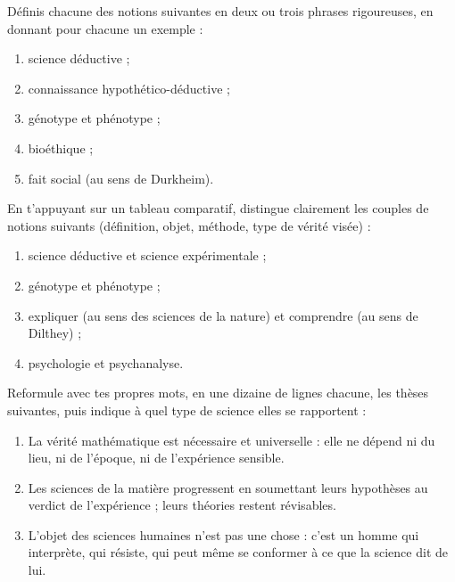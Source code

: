 \documentclass[11pt]{article}
\newcounter{popsec}
\newcounter{popsub}
\newcommand{\courssub}[1]{%
  \stepcounter{popsub}%
  \par\vspace{9pt}\noindent{\popxbold\fontsize{11.5}{13}\selectfont\color{popink}{\color{poporange}\thepopsec.\thepopsub}\hspace{6pt}#1}\par\nopagebreak\vspace{4pt}
}
\begin{document}
\begin{exercice}
Définis chacune des notions suivantes en deux ou trois phrases rigoureuses, en donnant pour chacune un exemple :
\begin{enumerate}
\item science déductive ;
\item connaissance hypothético-déductive ;
\item génotype et phénotype ;
\item bioéthique ;
\item fait social (au sens de Durkheim).
\end{enumerate}
\end{exercice}

\begin{exercice}
En t'appuyant sur un tableau comparatif, distingue clairement les couples de notions suivants (définition, objet, méthode, type de vérité visée) :
\begin{enumerate}
\item science déductive et science expérimentale ;
\item génotype et phénotype ;
\item expliquer (au sens des sciences de la nature) et comprendre (au sens de Dilthey) ;
\item psychologie et psychanalyse.
\end{enumerate}
\end{exercice}

\courssub{Je m'entraîne}

\begin{exercice}
Reformule avec tes propres mots, en une dizaine de lignes chacune, les thèses suivantes, puis indique à quel type de science elles se rapportent :
\begin{enumerate}
\item La vérité mathématique est nécessaire et universelle : elle ne dépend ni du lieu, ni de l'époque, ni de l'expérience sensible.
\item Les sciences de la matière progressent en soumettant leurs hypothèses au verdict de l'expérience ; leurs théories restent révisables.
\item L'objet des sciences humaines n'est pas une chose : c'est un homme qui interprète, qui résiste, qui peut même se conformer à ce que la science dit de lui.
\end{enumerate}
\end{exercice}
\end{document}
